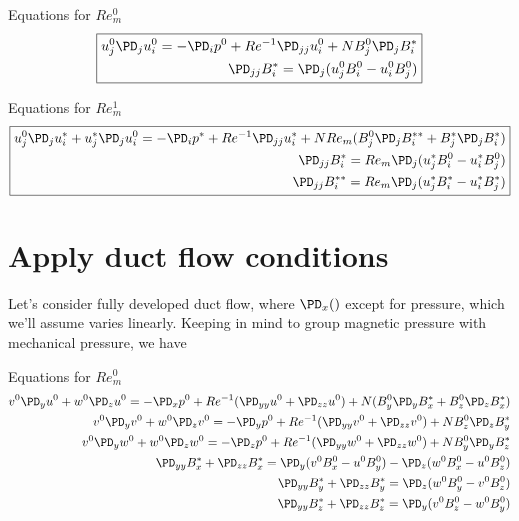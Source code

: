 \documentclass[11pt]{article}
\begin{document}
Equations for $Re_m^0$
\begin{equation}\boxed{\begin{aligned}
u_j^0 \PD_j u_i^0 = -\PD_i p^0 + Re^{-1} \PD_{jj} u_i^0 + N B_j^0 \PD_j B_i^* \\
\PD_{jj} B_i^* = \PD_j ( u_j^0 B_i^0 - u_i^0 B_j^0)
\end{aligned}}\end{equation}

Equations for $Re_m^1$
\begin{equation}\boxed{\begin{aligned}
u_j^0 \PD_j u_i^* + u_j^* \PD_j u_i^0 = -\PD_i p^*+ Re^{-1} \PD_{jj} u_i^* + N Re_m ( B_j^0 \PD_j B_i^{**} + B_j^* \PD_j B_i^* ) \\
\PD_{jj} B_i^{*}  = Re_m \PD_j (u_j^* B_i^{0} - u_i^* B_j^{0}) \\
\PD_{jj} B_i^{**} = Re_m \PD_j (u_j^* B_i^{*} - u_i^* B_j^{*}) \\
\end{aligned}}\end{equation}

\section{Apply duct flow conditions}
Let's consider fully developed duct flow, where $\PD_x()$ except for pressure, which we'll assume varies linearly. 
Keeping in mind to group magnetic pressure with mechanical pressure, we have

Equations for $Re_m^0$
\begin{equation}\begin{aligned}
v^0 \PD_y u^0 + w^0 \PD_z u^0 = -\PD_x p^0 + Re^{-1} (\PD_{yy} u^0 + \PD_{zz} u^0 ) + N (B_y^0 \PD_y B_x^* + B_z^0 \PD_z B_x^*) \\
v^0 \PD_y v^0 + w^0 \PD_z v^0 = -\PD_y p^0 + Re^{-1} (\PD_{yy} v^0 + \PD_{zz} v^0 ) + N  B_z^0 \PD_z B_y^* \\
v^0 \PD_y w^0 + w^0 \PD_z w^0 = -\PD_z p^0 + Re^{-1} (\PD_{yy} w^0 + \PD_{zz} w^0 ) + N  B_y^0 \PD_y B_z^* \\
\PD_{yy} B_x^* + \PD_{zz} B_x^* = \PD_y ( v^0 B_x^0 - u^0 B_y^0) - \PD_z ( w^0 B_x^0 - u^0 B_z^0) \\
\PD_{yy} B_y^* + \PD_{zz} B_y^* = \PD_z ( w^0 B_y^0 - v^0 B_z^0) \\
\PD_{yy} B_z^* + \PD_{zz} B_z^* = \PD_y ( v^0 B_z^0 - w^0 B_y^0) \\
\end{aligned}\end{equation}
\end{document}
